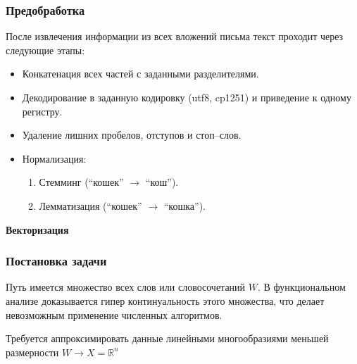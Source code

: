 \documentclass[compress,professionalfont]{beamer}
\begin{document}
\begin{frame}
\frametitle{Предобработка}

После извлечения информации из всех вложений письма текст проходит через следующие этапы:
\begin{itemize}
\item Конкатенация всех частей с заданными разделителями.
\item Декодирование в заданную кодировку (utf8, cp1251) и приведение к одному регистру.
\item Удаление лишних пробелов, отступов и стоп--слов.
\item Нормализация:
\begin{enumerate}
\item Стемминг (``кошек'' $\rightarrow$ ``кош'').
\item Лемматизация (``кошек'' $\rightarrow$ ``кошка'').
\end{enumerate}
\end{itemize}

\end{frame}

\begin{frame}

\begin{center}
\Huge\bf Векторизация
\end{center}

\end{frame}

\begin{frame}
\frametitle{Постановка задачи}

Путь имеется множество всех слов или словосочетаний $W$. В функциональном анализе доказывается гипер континуальность этого множества, что делает невозможным применение численных алгоритмов.

Требуется аппроксимировать данные линейными многообразиями меньшей размерности $W \rightarrow X = \mathbb{R}^n$

\end{frame}
\end{document}
